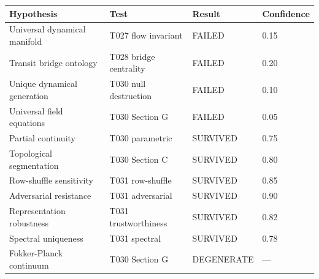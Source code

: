 \begin{tabular}{llll}
\toprule
Hypothesis & Test & Result & Confidence \\
\midrule
Universal dynamical manifold & T027 flow invariant & FAILED & 0.15 \\
Transit bridge ontology & T028 bridge centrality & FAILED & 0.20 \\
Unique dynamical generation & T030 null destruction & FAILED & 0.10 \\
Universal field equations & T030 Section G & FAILED & 0.05 \\
Partial continuity & T030 parametric & SURVIVED & 0.75 \\
Topological segmentation & T030 Section C & SURVIVED & 0.80 \\
Row-shuffle sensitivity & T031 row-shuffle & SURVIVED & 0.85 \\
Adversarial resistance & T031 adversarial & SURVIVED & 0.90 \\
Representation robustness & T031 trustworthiness & SURVIVED & 0.82 \\
Spectral uniqueness & T031 spectral & SURVIVED & 0.78 \\
Fokker-Planck continuum & T030 Section G & DEGENERATE & --- \\
\bottomrule
\end{tabular}

